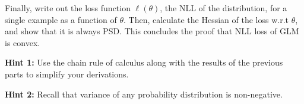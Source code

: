 \item {}
Finally, write out the loss function $\ell(\theta)$, the NLL of the
distribution, for a single example as a function of $\theta$. Then, calculate the Hessian of the
loss w.r.t $\theta$, and show that it is always PSD. This concludes the proof
that NLL loss of GLM is convex.

\textbf{Hint 1:} Use the chain rule of calculus along with the results of
the previous parts to simplify your derivations.

\textbf{Hint 2:} Recall that variance of any probability distribution is
non-negative.
